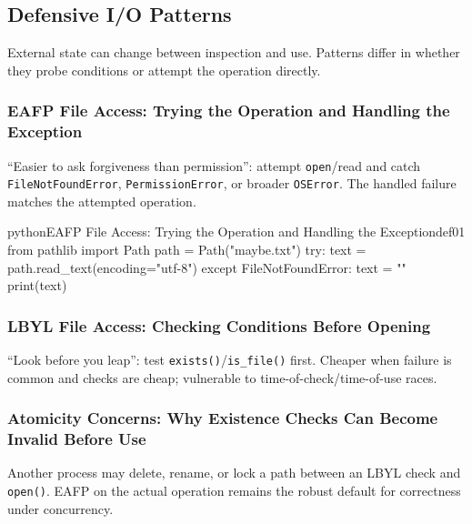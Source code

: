 \subsection{Defensive I/O Patterns}

External state can change between inspection and use. Patterns differ in whether they probe conditions or attempt the operation directly.

\subsubsection{EAFP File Access: Trying the Operation and Handling the Exception}

``Easier to ask forgiveness than permission'': attempt \texttt{open}/read and catch \texttt{FileNotFoundError}, \texttt{PermissionError}, or broader \texttt{OSError}. The handled failure matches the attempted operation.

\begin{codebox}[]{python}{EAFP File Access: Trying the Operation and Handling the Exception}{def01}
from pathlib import Path
path = Path("maybe.txt")
try:
    text = path.read_text(encoding="utf-8")
except FileNotFoundError:
    text = ""
print(text)
\end{codebox}


\subsubsection{LBYL File Access: Checking Conditions Before Opening}

``Look before you leap'': test \texttt{exists()}/\texttt{is\_file()} first. Cheaper when failure is common and checks are cheap; vulnerable to time-of-check/time-of-use races.

\subsubsection{Atomicity Concerns: Why Existence Checks Can Become Invalid Before Use}

Another process may delete, rename, or lock a path between an LBYL check and \texttt{open()}. EAFP on the actual operation remains the robust default for correctness under concurrency.

